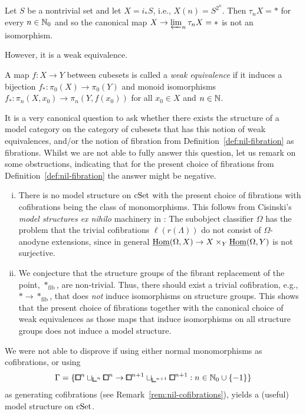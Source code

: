 \begin{example}
Let $S$ be a nontrivial set and let $X = i_\ast S$, i.e., $X(n) = S^{2^n}$.
Then $\tau_n X = \ast$ for every $n\in{\mathbb{N}}_0$ and so the canonical map $X\to\varprojlim_n\tau_nX = \ast$ is not an isomorphism.
\end{example}

However, it is a weak equivalence.

\begin{definition}
A map $f\colon X\to Y$ between cubesets is called a \emph{weak equivalence}
if it induces a bijection $f_\ast\colon\pi_0(X)\to\pi_0(Y)$ and
monoid isomorphisms $f_\ast\colon\pi_n(X,x_0)\to\pi_n(Y,f(x_0))$ for all $x_0\in X$ and $n\in{\mathbb{N}}$.
\end{definition}

\begin{remark}
It is a very canonical question to ask whether there exists the structure of a model category on the category of cubesets that has this notion of weak equivalences, and/or the notion of fibration from Definition~\ref{def:nil-fibration} as fibrations.
Whilst we are not able to fully answer this question, let us remark on some obstructions,
indicating that for the present choice of fibrations from Definition~\ref{def:nil-fibration}
the answer might be negative.
\begin{enumerate}[(i)]
    \item There is no model structure on $\mathrm{cSet}$ with the present choice of fibrations with cofibrations being the class of monomorphisms.
		This follows from Cisinski's \emph{model structures ex nihilo} machinery in \cite{Cisinski2025}: The subobject classifier $\Omega$
		has the problem that the trivial cofibrations $\ell(r(\Lambda))$ do not consist of $\Omega$-anodyne extensions,
since in general $\underline{\operatorname{Hom}}(\Omega, X)\to X\times_Y \underline{\operatorname{Hom}}(\Omega, Y)$ is not surjective.
    \item We conjecture that the structure groups of the fibrant replacement of the point, $\ast_{\mathrm{fib}}$, are non-trivial.
		Thus, there should exist a trivial cofibration, e.g., $\ast\to \ast_{\mathrm{fib}}$,
		that does \emph{not} induce isomorphisms on structure groups.
		This shows that the present choice of fibrations together with the canonical choice of weak equivalences as those maps that induce isomorphisms on all structure groups
		does not induce a model structure.
	\end{enumerate}

	We were not able to disprove if using either normal monomorphisms as cofibrations, or using
	\[
    \Gamma = \{{\bbox}^n\sqcup_{{\bbcor}^n}{\bbox}^n\to{\bbox}^{n+1}\sqcup_{{\bbcor}^{n+1}}{\bbox}^{n+1} : n\in\N_0\cup\{-1\}\}
\]
	as generating cofibrations (see Remark~\ref{rem:nil-cofibrations}), yields a (useful) model structure on $\mathrm{cSet}$.
\end{remark}
